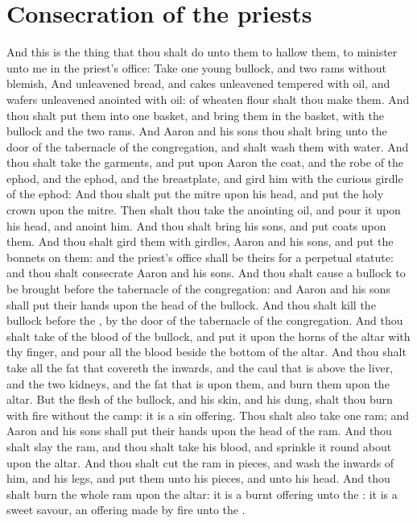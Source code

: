 \section*{Consecration of the priests}
\begin{biblechapter} %
\verse And this is the thing that thou shalt do unto them to hallow them, to minister unto me in the priest's office: Take one young bullock, and two rams without blemish,
\verse And unleavened bread, and cakes unleavened tempered with oil, and wafers unleavened anointed with oil: of wheaten flour shalt thou make them.
\verse And thou shalt put them into one basket, and bring them in the basket, with the bullock and the two rams.
\verse And Aaron and his sons thou shalt bring unto the door of the tabernacle of the congregation, and shalt wash them with water.
\verse And thou shalt take the garments, and put upon Aaron the coat, and the robe of the ephod, and the ephod, and the breastplate, and gird him with the curious girdle of the ephod:
\verse And thou shalt put the mitre upon his head, and put the holy crown upon the mitre.
\verse Then shalt thou take the anointing oil, and pour it upon his head, and anoint him.
\verse And thou shalt bring his sons, and put coats upon them.
\verse And thou shalt gird them with girdles, Aaron and his sons, and put the bonnets on them: and the priest's office shall be theirs for a perpetual statute: and thou shalt consecrate Aaron and his sons.
\verse And thou shalt cause a bullock to be brought before the tabernacle of the congregation: and Aaron and his sons shall put their hands upon the head of the bullock.
\verse And thou shalt kill the bullock before the \LORD, by the door of the tabernacle of the congregation.
\verse And thou shalt take of the blood of the bullock, and put it upon the horns of the altar with thy finger, and pour all the blood beside the bottom of the altar.
\verse And thou shalt take all the fat that covereth the inwards, and the caul that is above the liver, and the two kidneys, and the fat that is upon them, and burn them upon the altar.
\verse But the flesh of the bullock, and his skin, and his dung, shalt thou burn with fire without the camp: it is a sin offering.
\verse Thou shalt also take one ram; and Aaron and his sons shall put their hands upon the head of the ram.
\verse And thou shalt slay the ram, and thou shalt take his blood, and sprinkle it round about upon the altar.
\verse And thou shalt cut the ram in pieces, and wash the inwards of him, and his legs, and put them unto his pieces, and unto his head.
\verse And thou shalt burn the whole ram upon the altar: it is a burnt offering unto the \LORD: it is a sweet savour, an offering made by fire unto the \LORD.

\end{biblechapter}
